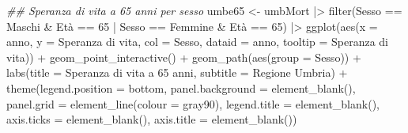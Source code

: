 \documentclass[
]{article}
\newenvironment{Shaded}{\begin{snugshade}}{\end{snugshade}}
\newcommand{\AttributeTok}[1]{\textcolor[rgb]{0.40,0.45,0.13}{#1}}
\newcommand{\DecValTok}[1]{\textcolor[rgb]{0.68,0.00,0.00}{#1}}
\newcommand{\DocumentationTok}[1]{\textcolor[rgb]{0.37,0.37,0.37}{\textit{#1}}}
\newcommand{\FunctionTok}[1]{\textcolor[rgb]{0.28,0.35,0.67}{#1}}
\newcommand{\NormalTok}[1]{\textcolor[rgb]{0.00,0.23,0.31}{#1}}
\newcommand{\OtherTok}[1]{\textcolor[rgb]{0.00,0.23,0.31}{#1}}
\newcommand{\SpecialCharTok}[1]{\textcolor[rgb]{0.37,0.37,0.37}{#1}}
\newcommand{\StringTok}[1]{\textcolor[rgb]{0.13,0.47,0.30}{#1}}
\begin{document}
\begin{Shaded}
\begin{Highlighting}[]
\DocumentationTok{\#\# Speranza di vita a 65 anni per sesso}
\NormalTok{umbe65 }\OtherTok{\textless{}{-}}\NormalTok{ umbMort }\SpecialCharTok{|\textgreater{}} 
  \FunctionTok{filter}\NormalTok{(Sesso }\SpecialCharTok{==} \StringTok{\textquotesingle{}Maschi\textquotesingle{}} \SpecialCharTok{\&}\NormalTok{ Età }\SpecialCharTok{==} \DecValTok{65} \SpecialCharTok{|}\NormalTok{ Sesso }\SpecialCharTok{==} \StringTok{\textquotesingle{}Femmine\textquotesingle{}} \SpecialCharTok{\&}\NormalTok{ Età }\SpecialCharTok{==} \DecValTok{65}\NormalTok{) }\SpecialCharTok{|\textgreater{}} 
  \FunctionTok{ggplot}\NormalTok{(}\FunctionTok{aes}\NormalTok{(}\AttributeTok{x =}\NormalTok{ anno, }\AttributeTok{y =} \StringTok{\textasciigrave{}}\AttributeTok{Speranza di vita}\StringTok{\textasciigrave{}}\NormalTok{, }\AttributeTok{col =}\NormalTok{ Sesso,}
             \AttributeTok{dataid =}\NormalTok{ anno, }\AttributeTok{tooltip =} \StringTok{\textasciigrave{}}\AttributeTok{Speranza di vita}\StringTok{\textasciigrave{}}\NormalTok{)) }\SpecialCharTok{+}
  \FunctionTok{geom\_point\_interactive}\NormalTok{() }\SpecialCharTok{+}
  \FunctionTok{geom\_path}\NormalTok{(}\FunctionTok{aes}\NormalTok{(}\AttributeTok{group =}\NormalTok{ Sesso)) }\SpecialCharTok{+}
  \FunctionTok{labs}\NormalTok{(}\AttributeTok{title =} \StringTok{\textquotesingle{}Speranza di vita a 65 anni\textquotesingle{}}\NormalTok{,}
       \AttributeTok{subtitle =} \StringTok{\textquotesingle{}Regione Umbria\textquotesingle{}}\NormalTok{) }\SpecialCharTok{+}
  \FunctionTok{theme}\NormalTok{(}\AttributeTok{legend.position =} \StringTok{\textquotesingle{}bottom\textquotesingle{}}\NormalTok{,}
        \AttributeTok{panel.background =} \FunctionTok{element\_blank}\NormalTok{(),}
        \AttributeTok{panel.grid =} \FunctionTok{element\_line}\NormalTok{(}\AttributeTok{colour =} \StringTok{\textquotesingle{}gray90\textquotesingle{}}\NormalTok{),}
        \AttributeTok{legend.title =} \FunctionTok{element\_blank}\NormalTok{(),}
        \AttributeTok{axis.ticks =} \FunctionTok{element\_blank}\NormalTok{(),}
        \AttributeTok{axis.title =} \FunctionTok{element\_blank}\NormalTok{())}


\end{Highlighting}
\end{Shaded}
\end{document}
